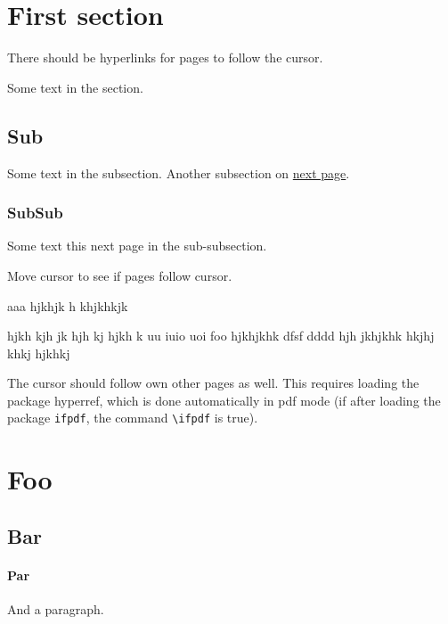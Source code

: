 \documentclass{article}
\begin{document}
\section{First section}

There should be hyperlinks for pages to follow the cursor. 

\tableofcontents



Some text in the section.  
 
\subsection {Sub}

Some text in the subsection. 
Another subsection on \hyperlink{next}{next page}.

\newpage

\subsubsection {SubSub} 

Some text this \hypertarget{next}{next page} in the sub-subsection. 

Move cursor to see if pages follow cursor.

\newpage

aaa hjkhjk h
\newpage
khjkhkjk

hjkh kjh jk  hjh kj hjkh k uu iuio uoi foo
hjkhjkhk  dfsf dddd hjh jkhjkhk hkjhj khkj  hjkhkj


The cursor should follow own other pages as well.
This requires loading the package hyperref, which is done
automatically in pdf mode (if after loading the package \texttt{ifpdf}, 
the command \verb"\ifpdf" is true). 



\section{Foo}

\subsection {Bar}


\paragraph {Par}

And a paragraph.
\end{document}
